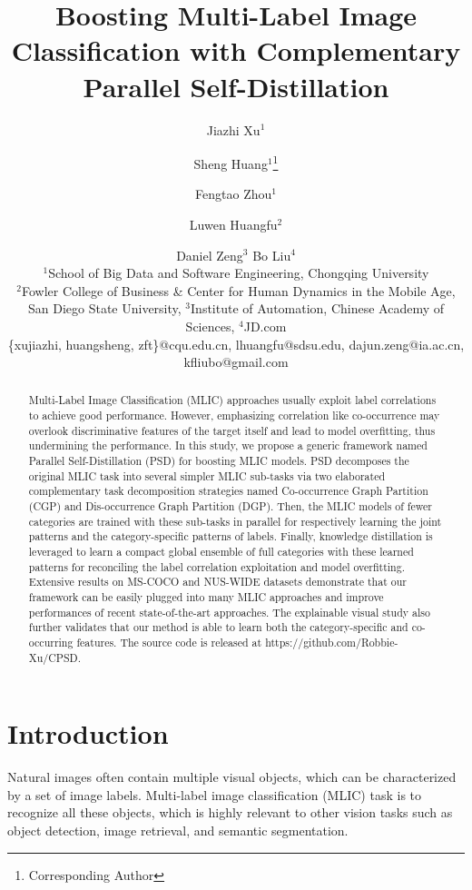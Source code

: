 \documentclass{article}
\title{Boosting Multi-Label Image Classification with Complementary Parallel Self-Distillation}
\author{
Jiazhi Xu$^1$\and
Sheng Huang$^1$\footnote{Corresponding Author}\and
Fengtao Zhou$^1$\and
Luwen Huangfu$^2$\and
Daniel Zeng$^3$\And
Bo Liu$^4$
\\
\affiliations
$^1$School of Big Data and Software Engineering, Chongqing University\\
$^2$Fowler College of Business \& Center for Human Dynamics in the Mobile Age, San Diego State University,
$^3$Institute of Automation, Chinese Academy of Sciences,
$^4$JD.com\\
\emails
\{xujiazhi, huangsheng, zft\}@cqu.edu.cn,
lhuangfu@sdsu.edu,
dajun.zeng@ia.ac.cn,
kfliubo@gmail.com
}
\begin{document}
\maketitle

\begin{abstract}
\vspace{-0.2cm}
Multi-Label Image Classification (MLIC) approaches usually exploit label correlations to achieve good performance.
However, emphasizing correlation like co-occurrence may overlook discriminative features of the target itself and lead to model overfitting, thus undermining the performance.
In this study, we propose a generic framework named Parallel Self-Distillation (PSD) for boosting MLIC models.
PSD decomposes the original MLIC task into several simpler MLIC sub-tasks via two elaborated complementary task decomposition strategies named Co-occurrence Graph Partition (CGP) and Dis-occurrence Graph Partition (DGP).
Then, the MLIC models of fewer categories are trained with these sub-tasks in parallel for respectively learning the joint patterns and the category-specific patterns of labels.
Finally, knowledge distillation is leveraged to learn a compact global ensemble of full categories with these learned patterns for reconciling the label correlation exploitation and model overfitting.
Extensive results on MS-COCO and NUS-WIDE datasets demonstrate that our framework can be easily plugged into many MLIC approaches and improve performances of recent state-of-the-art approaches.
The explainable visual study also further validates that our method is able to learn both the category-specific and co-occurring features. The source code is released at https://github.com/Robbie-Xu/CPSD.
\end{abstract}

\vspace{-0.45cm}
\section{Introduction}
\vspace{-0.05cm}
Natural images often contain multiple visual objects, which can be characterized by a set of image labels.
Multi-label image classification (MLIC) task is to recognize all these objects, which is highly relevant to other vision tasks such as object detection, image retrieval, and semantic segmentation.
\end{document}
